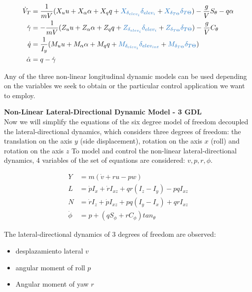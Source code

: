 \begin{align} 
\label{eq: modelo longitudinal gamma}
\dot V_T &= \frac{1}{mV}(X_u u + X_\alpha \alpha + X_q q + \textcolor{RoyalBlue}{X_{\delta_{elev_{i}}} \delta_{elev_{i}}}  + \textcolor{RoyalBlue}{X_{\delta_{T \Theta}} \delta_{T \Theta}}) - \frac{g}{V} S_{\theta} - q \alpha \\
\dot \gamma &= -\frac{1}{mV}(Z_u u + Z_\alpha \alpha + Z_q q + \textcolor{RoyalBlue}{Z_{\delta_{elev_{i}}} \delta_{elev_{i}}} + \textcolor{RoyalBlue}{Z_{\delta_{T \Theta}} \delta_{T \Theta}}) - \frac{g}{V} C_{\theta} \\
\dot q &= \frac{1}{I_{y}}(M_u u + M_\alpha \alpha + M_q q + \textcolor{RoyalBlue}{M_{\delta_{elev_{i}}} \delta_{elev_{int}}}  + \textcolor{RoyalBlue}{M_{\delta_{T \Theta}} \delta_{T \Theta}}) \\
\dot \alpha &= q - \dot \gamma 
\end{align}


Any of the three non-linear longitudinal dynamic models can be used depending on the variables we seek to obtain or the particular control application we want to employ. 

\bigskip
\textbf{Non-Linear Lateral-Directional Dynamic Model - 3 GDL}\\
Now we will simplify the equations of the six degree model of freedom decoupled the lateral-directional dynamics, which considers three degrees of freedom: the translation on the axis $y$ (side displacement), rotation on the axis $x$ (roll) and rotation on the axis $z$ To model and control the non-linear lateral-directional dynamics, 4 variables of the set of equations are considered: $v, p, r, \phi$. 


\begin{align} 
Y &= m (\dot v + ru - pw) \\
L &= \dot p I_x + \dot r I_{xz} + qr(I_z - I_y) - pq I_{xz} \\
N &=  \dot r I_z + \dot p I_{xz} + pq(I_y - I_x) + qr I_{xz}  \\
\dot \phi &= p + (q S_{\phi} + r C_{\phi}) tan_{\theta}
\end{align}

The lateral-directional dynamics of 3 degrees of freedom are observed: 
\begin{itemize}
    \item desplazamiento lateral $v$
    \item angular moment of roll $p$
    \item Angular moment of yaw $r$
\end{itemize}


